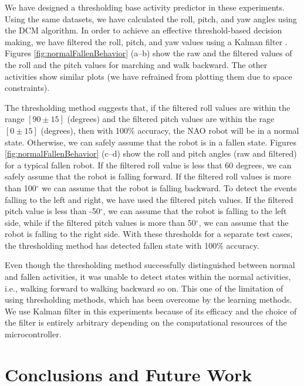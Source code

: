 \documentclass[letterpaper]{article}
\begin{document}
\begin{sloppy}
We have designed a thresholding base activity predictor in these experiments. Using the same 
datasets, we have calculated the roll, pitch, and yaw angles  using the DCM algorithm. In order to 
achieve an effective threshold-based decision making, we have filtered the roll, pitch, and
yaw values using a Kalman filter \cite{Welch:1995:IKF:897831}. Figures 
\ref{fig:normalFallenBehavior} (a--b) show the raw and the filtered values of the roll and the 
pitch values for marching and walk backward. The other activities show similar plots (we have 
refrained from plotting them due to space constraints). 

The thresholding method suggests that, if the filtered roll values are within the range $[90\pm15]$ 
(degrees) and the filtered pitch values are within the rage $[0\pm15]$ (degrees), then with 100\% 
accuracy, the NAO  robot will be in a normal state. Otherwise, we can safely assume that the robot 
is in a fallen state. Figures \ref{fig:normalFallenBehavior} (c--d) show the roll and pitch 
angles (raw and filtered) for a typical fallen robot. If the filtered roll value is less that 60 
degrees, we can safely assume that the robot is falling forward. If the filtered roll values is 
more than 100$^{\circ}$ we can assume that the robot is falling backward. To detect the events 
falling to the left and right, we have used the filtered pitch values. If the filtered pitch value 
is less than -50$^{\circ}$, we can assume that the robot is falling to the left side, while if the 
filtered pitch values is more than 50$^{\circ}$, we can assume that the robot is falling to the right 
side. With these thresholds for a separate test cases, the thresholding method has detected fallen 
state with 100\% accuracy. 

Even though the thresholding method successfully distinguished between normal and fallen 
activities, it was unable to detect states within the normal activities, i.e., walking forward 
to walking backward so on. This one of the limitation of using thresholding methods, which has 
been overcome by the learning methods.  We use Kalman filter in this experiments because of its 
efficacy and the choice of the filter is entirely arbitrary depending on the computational 
resources of the microcontroller.  


\section{Conclusions and Future Work}


\end{sloppy}
\end{document}
